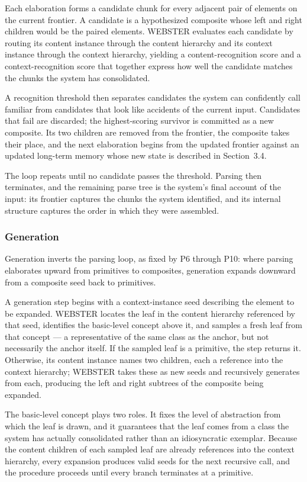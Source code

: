 \documentclass{article}
\begin{document}
Each elaboration forms a candidate chunk for every adjacent pair of elements on the current frontier. A candidate is a hypothesized composite whose left and right children would be the paired elements. WEBSTER evaluates each candidate by routing its content instance through the content hierarchy and its context instance through the context hierarchy, yielding a content-recognition score and a context-recognition score that together express how well the candidate matches the chunks the system has consolidated.

A recognition threshold then separates candidates the system can confidently call familiar from candidates that look like accidents of the current input. Candidates that fail are discarded; the highest-scoring survivor is committed as a new composite. Its two children are removed from the frontier, the composite takes their place, and the next elaboration begins from the updated frontier against an updated long-term memory whose new state is described in Section~3.4.

The loop repeats until no candidate passes the threshold. Parsing then terminates, and the remaining parse tree is the system's final account of the input: its frontier captures the chunks the system identified, and its internal structure captures the order in which they were assembled.

\subsubsection{Generation}

Generation inverts the parsing loop, as fixed by P6 through P10: where parsing elaborates upward from primitives to composites, generation expands downward from a composite seed back to primitives.

A generation step begins with a context-instance seed describing the element to be expanded. WEBSTER locates the leaf in the content hierarchy referenced by that seed, identifies the basic-level concept above it, and samples a fresh leaf from that concept --- a representative of the same class as the anchor, but not necessarily the anchor itself. If the sampled leaf is a primitive, the step returns it. Otherwise, its content instance names two children, each a reference into the context hierarchy; WEBSTER takes these as new seeds and recursively generates from each, producing the left and right subtrees of the composite being expanded.

The basic-level concept plays two roles. It fixes the level of abstraction from which the leaf is drawn, and it guarantees that the leaf comes from a class the system has actually consolidated rather than an idiosyncratic exemplar. Because the content children of each sampled leaf are already references into the context hierarchy, every expansion produces valid seeds for the next recursive call, and the procedure proceeds until every branch terminates at a primitive.
\end{document}
